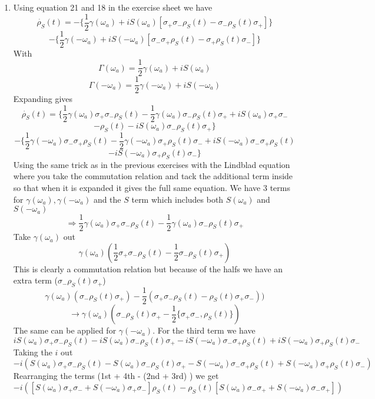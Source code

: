\documentclass[12pt]{article}
\begin{document}
\begin{enumerate}
\item Using equation 21 and 18 in the exercise sheet we have 
$$ \dot{\rho_S}(t) = - \{ \frac{1}{2} \gamma (\omega_a) + i S(\omega_a) [ \sigma_+ \sigma_- \rho_S (t) - \sigma_- \rho_S (t) \sigma_+ ] \} $$
$$ - \{ \frac{1}{2} \gamma (- \omega_a) + i S(- \omega_a) [ \sigma_- \sigma_+ \rho_S (t) - \sigma_+ \rho_S (t) \sigma_- ] \} $$
With 
$$ \Gamma (\omega_a ) = \frac{1}{2} \gamma (\omega_a) + i S (\omega_a) $$
$$ \Gamma (-\omega_a ) = \frac{1}{2} \gamma (-\omega_a) + i S (-\omega_a) $$
Expanding gives 
$$ \dot{\rho_S}(t) = \{ \frac{1}{2} \gamma (\omega_a) \sigma_+ \sigma_- \rho_S(t) - \frac{1}{2} \gamma (\omega_a) \sigma_- \rho_S (t) \sigma_+ + i S (\omega_a) \sigma_+ \sigma_- $$
$$ - \rho_S (t) - iS (\omega_a) \sigma_- \rho_S (t) \sigma_+ \} $$
$$ - \{ \frac{1}{2} \gamma ( - \omega_a ) \sigma_- \sigma_+ \rho_S (t) - \frac{1}{2} \gamma (- \omega_a) \sigma_+ \rho_S (t) \sigma_- + i S (-\omega_a) \sigma_- \sigma_+ \rho_S (t) $$
$$ - i S (- \omega_a ) \sigma_+ \rho_S (t) \sigma_- \} $$
Using the same trick as in the previous exercises with the Lindblad equation where you take the commutation relation and tack the additional term inside so that when it is expanded it gives the full same equation. We have 3 terms for $\gamma (\omega_a), \gamma (-\omega_a)$ and the $S$ term which includes both $S(\omega_a)$ and $S (-\omega_a)$
$$ \Rightarrow \frac{1}{2} \gamma ( \omega_a) \sigma_+ \sigma_- \rho_S (t) - \frac{1}{2} \gamma (\omega_a) \sigma_- \rho_S (t) \sigma_+ $$
Take $\gamma (\omega_a)$ out 
$$ \gamma (\omega_a ) (\frac{1}{2} \sigma_+ \sigma_- \rho_S (t) - \frac{1}{2} \sigma_- \rho_S (t) \sigma_+ ) $$
This is clearly a commutation relation but because of the halfs we have an extra term ($\sigma_- \rho_S (t) \sigma_+ $) 
$$ \gamma (\omega_a) ( \sigma_- \rho_S (t) \sigma_+) - \frac{1}{2} ( \sigma_+ \sigma_- \rho_S (t) - \rho_S (t) \sigma_+ \sigma_-)) $$
$$ \rightarrow \gamma (\omega_a ) ( \sigma_- \rho_S (t) \sigma_+ - \frac{1}{2} \{ \sigma_+ \sigma_-, \rho_S (t) \}) $$
The same can be applied for $\gamma (- \omega_a)$. For the third term we have 
$$ i S( \omega_a) \sigma_+ \sigma_- \rho_S (t) - i S (\omega_a ) \sigma_- \rho_S (t) \sigma_+ - i S (- \omega_a ) \sigma_- \sigma_+ \rho_S (t) + i S (- \omega_a) \sigma_+ \rho_S (t) \sigma_- $$
Taking the $i$ out 
$$ -i ( S ( \omega_a ) \sigma_+ \sigma_- \rho_S (t) - S(\omega_a ) \sigma_- \rho_S (t) \sigma_+ - S (- \omega_a) \sigma_- \sigma_+ \rho_S (t) + S(-\omega_a) \sigma_+ \rho_S (t) \sigma_- ) $$
Rearranging the terms (1st + 4th - (2nd + 3rd) ) we get 
$$ -i( [ S(\omega_a) \sigma_+ \sigma_- + S(- \omega_a ) \sigma_+ \sigma_- ] \rho_S (t) - \rho_S (t) [ S(\omega_a) \sigma_- \sigma_+ + S(- \omega_a) \sigma_- \sigma_+ ] ) $$

\end{enumerate}
\end{document}
